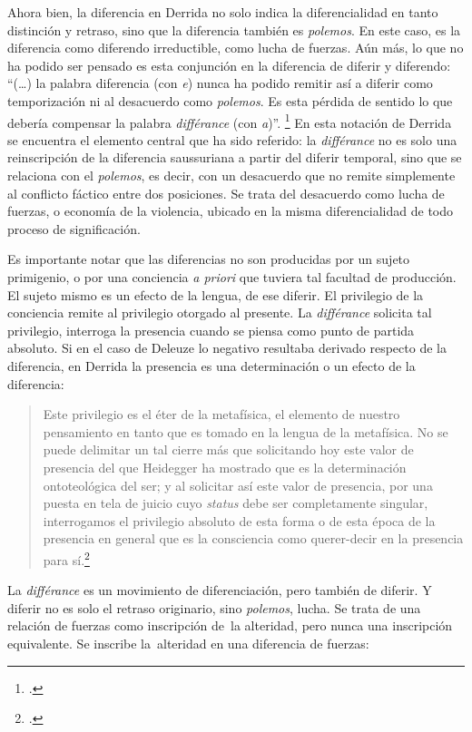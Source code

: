 Ahora bien, la diferencia en Derrida no solo indica la diferencialidad en tanto distinción y retraso, sino que la diferencia también es \textit{polemos}. En este caso, es la diferencia como diferendo irreductible, como lucha de fuerzas. Aún más, lo que no ha podido ser pensado es esta conjunción en la diferencia de diferir y diferendo: \enquote{(\ldots) la palabra diferencia (con \emph{e}) nunca ha podido remitir así a diferir como temporización ni al desacuerdo como \emph{polemos}. Es esta pérdida de sentido lo que debería compensar  la palabra \emph{différance} (con \emph{a})}. \footcite[8]{@6987-DERRIDA1989} En esta notación de Derrida se encuentra el elemento central que ha sido referido: la \emph{différance} no es solo una reinscripción de la diferencia saussuriana a partir del diferir temporal, sino que se relaciona con el \emph{polemos}, es decir, con un desacuerdo que no remite simplemente al conflicto fáctico entre dos posiciones. Se trata del desacuerdo como lucha de fuerzas, o economía de la violencia, ubicado en la misma diferencialidad de todo proceso de significación.

Es importante notar que las diferencias no son producidas por un sujeto primigenio, o por una conciencia \emph{a priori} que tuviera tal facultad de producción. El sujeto mismo es un efecto de la lengua, de ese diferir. El privilegio de la conciencia remite al privilegio otorgado al presente. La \emph{différance} solicita tal privilegio, interroga la presencia cuando se piensa como punto de partida absoluto. Si en el caso de Deleuze lo negativo resultaba derivado respecto de la diferencia, en Derrida la presencia es una determinación o un efecto de la diferencia:

\begin{quote}
Este privilegio es el éter de la metafísica, el elemento de nuestro pensamiento en tanto que es tomado en la lengua de la metafísica. No se puede delimitar un tal cierre más que solicitando hoy este valor de presencia del que Heidegger ha mostrado que es la determinación ontoteológica del ser; y al solicitar así este valor de presencia, por una puesta en tela de juicio cuyo \emph{status} debe ser completamente singular, interrogamos el privilegio absoluto de esta forma o de esta época de la presencia en general que es la consciencia como querer-decir en la presencia para sí.\footcite[17]{@6987-DERRIDA1989}
\end{quote}

La \emph{différance} es un movimiento de diferenciación, pero también de diferir. Y diferir no es solo el retraso originario, sino \emph{polemos}, lucha. Se trata de una relación de fuerzas como inscripción de~la alteridad, pero nunca una inscripción equivalente. Se inscribe la~alteridad en una diferencia de fuerzas:

